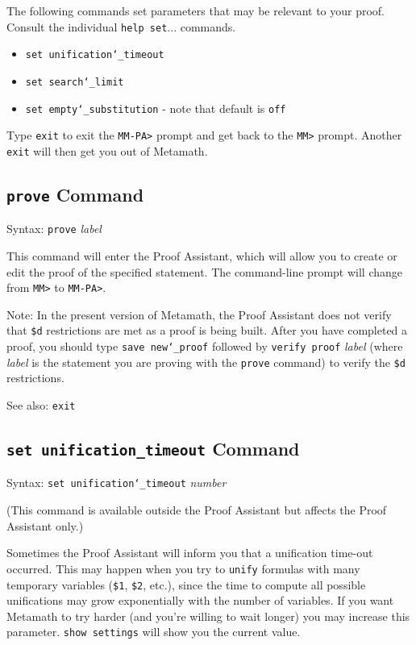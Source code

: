 The following commands set parameters that may be relevant to your proof.
Consult the individual \texttt{help set}... commands.
\begin{itemize}
   \item[] \texttt{set unification{\char`\_}timeout}
 \item[]
    \texttt{set search{\char`\_}limit}
  \item[]
    \texttt{set empty{\char`\_}substitution} - note that default is \texttt{off}
\end{itemize}

Type \texttt{exit} to exit the \texttt{MM-PA>}
 prompt and get back to the \texttt{MM>} prompt.
Another \texttt{exit} will then get you out of Metamath.



\subsection{\texttt{prove} Command}
Syntax:  \texttt{prove} {\em label}

This command will enter the Proof Assistant, which will
allow you to create or edit the proof of the specified statement.
The command-line prompt will change from \texttt{MM>} to \texttt{MM-PA>}.

Note:  In the present version of
Metamath, the Proof
Assistant does not verify that \texttt{\$d} restrictions are met as a proof is being built.  After you
have completed a proof, you should type \texttt{save new{\char`\_}proof}
followed by \texttt{verify proof} {\em label} (where {\em label} is the
statement you are proving with the \texttt{prove} command) to verify the
\texttt{\$d} restrictions.

See also: \texttt{exit}

\subsection{\texttt{set unification\_timeout} Command}
Syntax:  \texttt{set unification{\char`\_}timeout} {\em number}

(This command is available outside the Proof Assistant but affects the
Proof Assistant only.)

Sometimes the Proof Assistant will inform you that a unification
time-out occurred.  This may happen when you try to \texttt{unify}
formulas with many temporary variables
(\texttt{\$1}, \texttt{\$2}, etc.), since the time to compute all possible
unifications may grow exponentially with the number of variables.  If
you want Metamath to try harder (and you're willing to wait longer) you
may increase this parameter.  \texttt{show settings} will show you the
current value.



